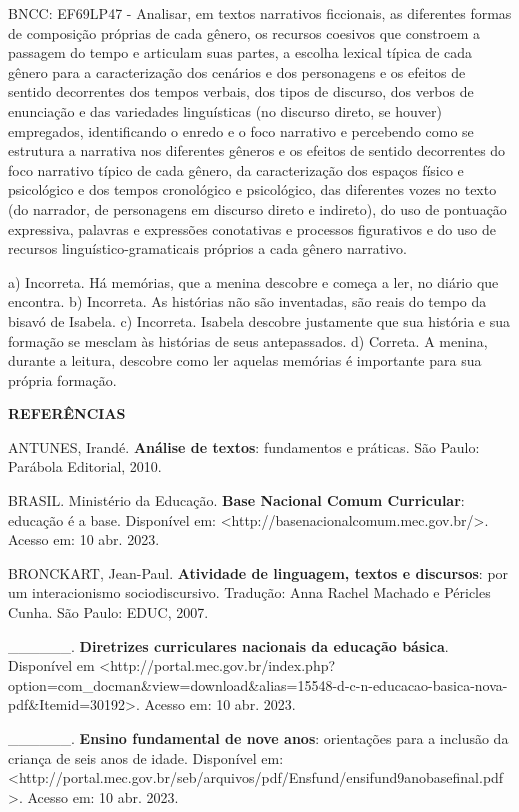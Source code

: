 \begin{itemize}
\begin{itemize}
\begin{escolha}
\begin{escolha}
\begin{escolha}
\begin{escolha}
\begin{escolha}
\begin{escolha}
\begin{escolha}
\begin{escolha}
\begin{escolha}
\begin{escolha}
\begin{escolha}
\begin{escolha}
\begin{escolha}
\begin{escolha}
\begin{escolha}
BNCC: EF69LP47 - Analisar, em textos narrativos ficcionais, as
diferentes formas de composição próprias de cada gênero, os recursos
coesivos que constroem a passagem do tempo e articulam suas partes, a
escolha lexical típica de cada gênero para a caracterização dos cenários
e dos personagens e os efeitos de sentido decorrentes dos tempos
verbais, dos tipos de discurso, dos verbos de enunciação e das
variedades linguísticas (no discurso direto, se houver) empregados,
identificando o enredo e o foco narrativo e percebendo como se estrutura
a narrativa nos diferentes gêneros e os efeitos de sentido decorrentes
do foco narrativo típico de cada gênero, da caracterização dos espaços
físico e psicológico e dos tempos cronológico e psicológico, das
diferentes vozes no texto (do narrador, de personagens em discurso
direto e indireto), do uso de pontuação expressiva, palavras e
expressões conotativas e processos figurativos e do uso de recursos
linguístico-gramaticais próprios a cada gênero narrativo.

a) Incorreta. Há memórias, que a menina descobre e começa a ler, no
diário que encontra. b) Incorreta. As histórias não são inventadas, são
reais do tempo da bisavó de Isabela. c) Incorreta. Isabela descobre
justamente que sua história e sua formação se mesclam às histórias de
seus antepassados. d) Correta. A menina, durante a leitura, descobre
como ler aquelas memórias é importante para sua própria formação.

\textbf{REFERÊNCIAS}

ANTUNES, Irandé. \textbf{Análise de textos}: fundamentos e práticas. São
Paulo: Parábola Editorial, 2010.

BRASIL. Ministério da Educação. \textbf{Base Nacional Comum Curricular}:
educação é a base. Disponível em:
\textless{}http://basenacionalcomum.mec.gov.br/\textgreater{}. Acesso
em: 10 abr. 2023.

BRONCKART, Jean-Paul. \textbf{Atividade de linguagem, textos e
discursos}: por um interacionismo sociodiscursivo. Tradução: Anna Rachel
Machado e Péricles Cunha. São Paulo: EDUC, 2007.

\_\_\_\_\_\_. \textbf{Diretrizes curriculares nacionais da educação
básica}. Disponível em
\textless{}http://portal.mec.gov.br/index.php?option=com\_docman\&view=download\&alias=15548-d-c-n-educacao-basica-nova-pdf\&Itemid=30192\textgreater{}.
Acesso em: 10 abr. 2023.

\_\_\_\_\_\_. \textbf{Ensino fundamental de nove anos}: orientações para
a inclusão da criança de seis anos de idade. Disponível em:
\textless{}http://portal.mec.gov.br/seb/arquivos/pdf/Ensfund/ensifund9anobasefinal.pdf\textgreater{}.
Acesso em: 10 abr. 2023.


\end{escolha}
\end{escolha}
\end{escolha}
\end{escolha}
\end{escolha}
\end{escolha}
\end{escolha}
\end{escolha}
\end{escolha}
\end{escolha}
\end{escolha}
\end{escolha}
\end{escolha}
\end{escolha}
\end{escolha}
\end{itemize}
\end{itemize}
